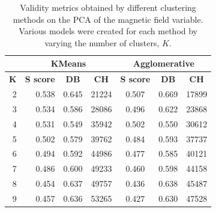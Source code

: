 \begin{table}[h]
    \caption[Validity metrics for PCA of the Magnetic Field]{Validity metrics obtained by different clustering methods on the PCA of the magnetic field variable. Various models were created for each method by varying the number of clusters, $K$.}\label{tab:pca_b}
    \begin{tabular}{@{}rrrrccc@{}}
        \toprule
    \multicolumn{1}{c}{\textbf{}}   & \multicolumn{3}{c}{\textbf{KMeans}}                                                                       & \multicolumn{3}{c}{\textbf{Agglomerative}}   \\ \midrule
    \multicolumn{1}{c|}{\textbf{K}} & \multicolumn{1}{c}{\textbf{S score}} & \multicolumn{1}{c}{\textbf{DB}} & \multicolumn{1}{c|}{\textbf{CH}} & \textbf{S score} & \textbf{DB} & \textbf{CH} \\ \midrule
    \multicolumn{1}{r|}{2}          & 0.538                                & 0.645                           & \multicolumn{1}{r|}{21224}   & 0.507            & 0.669       & 17899   \\
    \multicolumn{1}{r|}{3}          & 0.534                                & 0.586                           & \multicolumn{1}{r|}{28086}   & 0.496            & 0.622       & 23868   \\
    \multicolumn{1}{r|}{4}          & 0.531                                & 0.549                           & \multicolumn{1}{r|}{35942}   & 0.502            & 0.550       & 30612   \\
    \multicolumn{1}{r|}{5}          & 0.502                                & 0.579                           & \multicolumn{1}{r|}{39762}   & 0.484            & 0.593       & 37737   \\
    \multicolumn{1}{r|}{6}          & 0.494                                & 0.592                           & \multicolumn{1}{r|}{44986}   & 0.477            & 0.585       & 40121   \\
    \multicolumn{1}{r|}{7}          & 0.486                                & 0.600                           & \multicolumn{1}{r|}{49233}   & 0.460            & 0.598       & 44158   \\
    \multicolumn{1}{r|}{8}          & 0.454                                & 0.637                           & \multicolumn{1}{r|}{49757}   & 0.436            & 0.638       & 45487   \\
    \multicolumn{1}{r|}{9}          & 0.457                                & 0.636                           & \multicolumn{1}{r|}{53265}   & 0.427            & 0.630       & 47528   \\ \bottomrule
    \end{tabular}
    \end{table}

